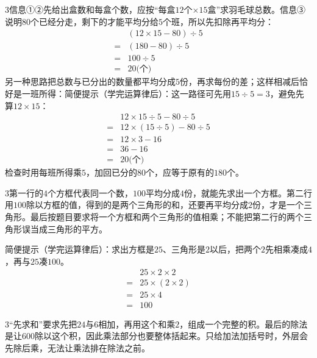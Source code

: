 \documentclass[multi=snippet,border={5bp 20bp 5bp 5bp}]{standalone}
\newenvironment{snippet}[3]{\begin{minipage}{#1bp}\color{answerred}\fontsize{#2}{#3}\selectfont\raggedright}{\end{minipage}}
\begin{document}
\begin{snippet}{505}{11.5}{14}\begin{multicols}{3}\raggedcolumns 信息①②先给出盒数和每盒个数，应按“每盒\(12\)\allowbreak 个\(\times15\)\allowbreak 盒”求羽毛球总数。信息③说明\(80\)\allowbreak 个已经分走，剩下的才能平均分给\(5\)\allowbreak 个班，所以先扣除再平均分：\[\begin{aligned}&(12\times15-80)\div5\\={}&(180-80)\div5\\={}&100\div5\\={}&20\text{(个)}\end{aligned}\]另一种思路把总数与已分出的数量都平均分成\(5\)\allowbreak 份，再求每份的差；这样相减后恰好是一班所得：简便提示（学完运算律后）：这一路径可先用\(15\div5=3\)\allowbreak ，避免先算\(12\times15\)\allowbreak ：\[\begin{aligned}&12\times15\div5-80\div5\\={}&12\times(15\div5)-80\div5\\={}&12\times3-16\\={}&36-16\\={}&20\text{(个)}\end{aligned}\]检查时用每班所得乘\(5\)\allowbreak ，加回已分的\(80\)\allowbreak 个，应等于原有的\(180\)\allowbreak 个。\end{multicols}\end{snippet}
\begin{snippet}{505}{11.5}{14}\begin{multicols}{3}\raggedcolumns 第一行的\(4\)\allowbreak 个方框代表同一个数，\(100\)\allowbreak 平均分成\(4\)\allowbreak 份，就能先求出一个方框。第二行用\(100\)\allowbreak 除以方框的值，得到的是两个三角形的和，还要再平均分成\(2\)\allowbreak 份，才是一个三角形。最后按题目要求将一个方框和两个三角形的值相乘；不能把第二行的两个三角形误当成三角形的平方。\par 简便提示（学完运算律后）：求出方框是\(25\)\allowbreak 、三角形是\(2\)\allowbreak 以后，把两个\(2\)\allowbreak 先相乘凑成\(4\)\allowbreak ，再与\(25\)\allowbreak 凑\(100\)\allowbreak 。\[\begin{aligned}&25\times2\times2\\={}&25\times(2\times2)\\={}&25\times4\\={}&100\end{aligned}\]\end{multicols}\end{snippet}
\begin{snippet}{505}{11.5}{14}\begin{multicols}{3}\raggedcolumns “先求和”要求先把\(24\)\allowbreak 与\(6\)\allowbreak 相加，再用这个和乘\(2\)\allowbreak ，组成一个完整的积。最后的除法是让\(600\)\allowbreak 除以这个积，因此乘法部分也要整体括起来。只给加法加括号时，外层会先除后乘，无法让乘法排在除法之前。\end{multicols}\end{snippet}
\end{document}
